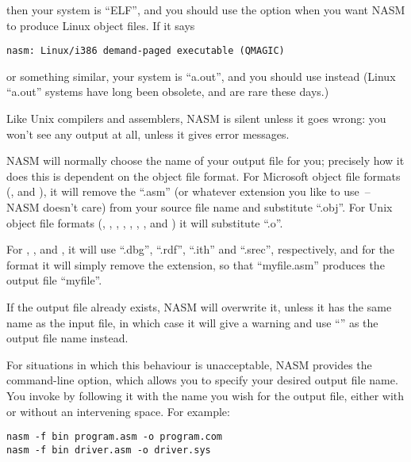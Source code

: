 then your system is ``ELF'', and you should use the option 
when you want NASM to produce Linux object files. If it says

\begin{lstlisting}
nasm: Linux/i386 demand-paged executable (QMAGIC)
\end{lstlisting}

or something similar, your system is ``a.out'', and you should use
 instead (Linux ``a.out'' systems have long been
obsolete, and are rare these days.)

Like Unix compilers and assemblers, NASM is silent unless it
goes wrong: you won't see any output at all, unless it gives error
messages.


NASM will normally choose the name of your output file for you;
precisely how it does this is dependent on the object file format.
For Microsoft object file formats (, 
and ), it will remove the ``.asm'' 
(or whatever extension you like to use~-- NASM doesn't care) from your
source file name and substitute ``.obj''. For Unix object file formats
(, , , , ,
, ,  and )
it will substitute ``.o''.

For , ,  and , it will use
``.dbg'', ``.rdf'', ``.ith'' and ``.srec'', respectively, and for
the  format it will simply remove the extension, so that
``myfile.asm'' produces the output file ``myfile''.

If the output file already exists, NASM will overwrite it, unless it
has the same name as the input file, in which case it will give a
warning and use ``'' as the output
file name instead.

For situations in which this behaviour is unacceptable, NASM
provides the  command-line option, which allows you to
specify your desired output file name. You invoke  by
following it with the name you wish for the output file, either
with or without an intervening space. For example:

\begin{lstlisting}
nasm -f bin program.asm -o program.com
nasm -f bin driver.asm -o driver.sys
\end{lstlisting}

